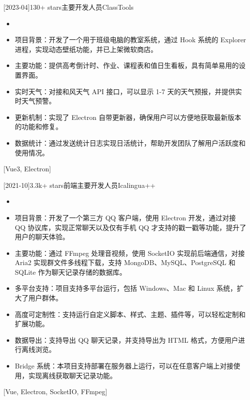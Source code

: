 \documentclass[zh]{resume}
\begin{document}
\begin{projects}
  [2023-04]{130+ stars}{主要开发人员}{ClassTools}{
    \begin{itemize}
      \item {}
      \item 项目背景：开发了一个用于班级电脑的教室系统，通过 Hook 系统的 Explorer 进程，实现动态壁纸功能，并已上架微软商店。
      \item 主要功能：提供高考倒计时、作业、课程表和值日生看板，具有简单易用的设置界面。
      \item 实时天气：对接和风天气 API 接口，可以显示 1-7 天的天气预报，并提供实时天气预警。
      \item 更新机制：实现了 Electron 自带更新器，确保用户可以方便地获取最新版本的功能和修复。
      \item 数据统计：通过发送统计日志实现日活统计，帮助开发团队了解用户活跃度和使用情况。
    \end{itemize}
  }[Vue3, Electron]

  \separator{0.5ex}
  [2021-10]{3.3k+ stars}{前端主要开发人员}{Icalingua++}{
    \begin{itemize}
      \item {}
      \item 项目背景：开发了一个第三方 QQ 客户端，使用 Electron 开发，通过对接 QQ 协议库，实现正常聊天以及仅有手机 QQ 才支持的戳一戳等功能，提升了用户的聊天体验。
      \item 主要功能：通过 FFmpeg 处理音视频，使用 SocketIO 实现前后端通信，对接 Aria2 实现群文件多线程下载，支持 MongoDB、MySQL、PostgreSQL 和 SQLite 作为聊天记录存储的数据库。
      \item 多平台支持：项目支持多平台运行，包括 Windows、Mac 和 Linux 系统，扩大了用户群体。
      \item 高度可定制性：支持运行自定义脚本、样式、主题、插件等，可以轻松定制和扩展功能。
      \item 数据导出：支持导出 QQ 聊天记录，并支持导出为 HTML 格式，方便用户进行离线浏览。
      \item Bridge 系统：本项目支持部署在服务器上运行，可以在任意客户端上对接使用，实现离线获取聊天记录功能。
    \end{itemize}
  }[Vue, Electron, SocketIO, FFmpeg]
\end{projects}
\end{document}
